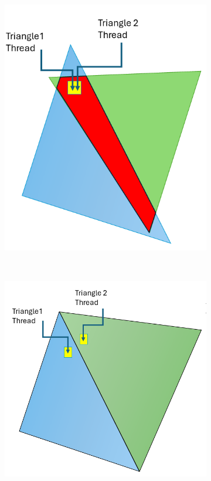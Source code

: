 
\begin{figure}
    \centering
    \begin{subfigure}[b]{0.3\textwidth}
        \includegraphics[width=\textwidth]{TriangleJoinsA}
        \label{fig:gull}
    \end{subfigure}
    ~ %
    \begin{subfigure}[b]{0.3\textwidth}
        \includegraphics[width=\textwidth]{TriangleJoinsB}

\end{subfigure}
\end{figure}

